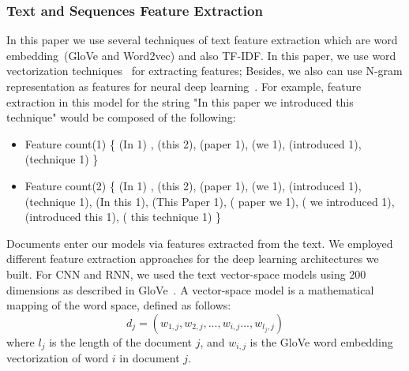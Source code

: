 \documentclass[sigconf, final]{acmart}
\begin{document}
\subsubsection{Text and Sequences Feature Extraction}
In this paper we use several techniques of text feature extraction which are word embedding~(GloVe and Word2vec) and also TF-IDF. 
In this paper, we use word vectorization techniques~\cite{hotta2010word} for extracting features; Besides, we also can use N-gram representation as features for neural deep learning~\cite{kevselj2003n,dave2003mining}. For example, feature extraction in this model for the string "In this paper we introduced this technique" would be composed of the following:
\begin{itemize}
\item Feature count(1) \{ (In 1) , (this 2), (paper 1), (we 1), (introduced 1), (technique 1) \}

\item Feature count(2) \{ (In 1) , (this 2), (paper 1), (we 1), (introduced 1), (technique 1), (In this 1), (This Paper 1), ( paper we 1), ( we introduced 1), (introduced this 1), ( this technique 1) \}

\end{itemize}
Documents enter our models via features extracted from the text. We employed different feature extraction approaches for the deep learning architectures we built. For CNN and RNN, we used the text vector-space models using $200$ dimensions as described in GloVe~\cite{pennington2014glove}. A vector-space model is a mathematical mapping of the word space, defined as follows:
\begin{equation}
    d_j = (w_{1,j},w_{2,j},...,w_{i,j}...,w_{l_j,j})
\end{equation}
where $l_j$ is the length of the document $j$, and $w_{i,j}$ is the GloVe word embedding vectorization of word $i$ in document $j$.
\end{document}
